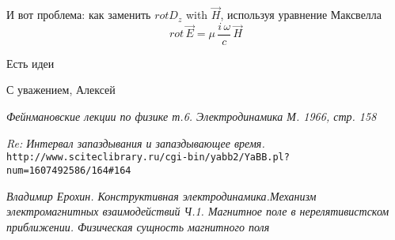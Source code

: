 \documentclass{article}
\begin{document}
И вот проблема: как заменить $rot D_{z}$ with $\vec{H}$, используя уравнение Максвелла
$$rot\,\vec{E} = \mu\,\frac{i\,\omega}{c}\,\vec{H}$$

Есть идеи



С уважением, Алексей

\begin{thebibliography}{99}



\textit{Фейнмановские лекции по физике т.6. Электродинамика М. 1966, стр. 158}

\textit{Re: Интервал запаздывания и запаздывающее время.}
\\\texttt{http://www.sciteclibrary.ru/cgi-bin/yabb2/YaBB.pl?num=1607492586/164\#164}

\textit{Владимир Ерохин. Конструктивная электродинамика.Механизм электромагнитных взаимодействий Ч.1. Магнитное поле в нерелятивистском приближении. Физическая сущность магнитного поля}








\end{thebibliography}
\end{document}
